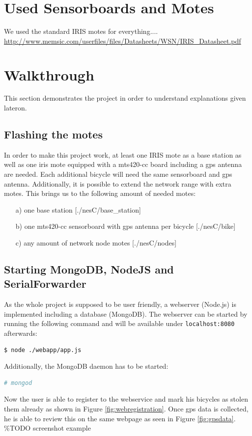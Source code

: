 \documentclass[a4paper]{article}
\begin{document}
\section{Used Sensorboards and Motes}
We used the standard IRIS motes for everything....
\url{http://www.memsic.com/userfiles/files/Datasheets/WSN/IRIS_Datasheet.pdf}

\section{Walkthrough}
This section demonstrates the project in order to understand explanations given lateron. 
\subsection{Flashing the motes}
In order to make this project work, at least one IRIS mote as a base station as well as one iris mote equipped with a mts420-cc board including a gps antenna are needed. Each additional bicycle will need the same sensorboard and gps antenna. Additionally, it is possible to extend the network range with extra motes. This brings us to the following amount of needed motes:
\begin{enumerate}
\item[a)] one base station [./nesC/base\_station]
\item[b)] one mts420-cc sensorboard with gps antenna per bicycle [./nesC/bike]
\item[c)] any amount of network node motes [./nesC/nodes]
\end{enumerate}
\subsection{Starting MongoDB, NodeJS and SerialForwarder}
As the whole project is supposed to be user friendly, a webserver (Node.js) is implemented including a database (MongoDB).
The webserver can be started by running the following command and will be available under \texttt{localhost:8080} afterwards:
\begin{lstlisting}[frame=single,language=bash]
$ node ./webapp/app.js
\end{lstlisting}
Additionally, the MongoDB daemon has to be started:
\begin{lstlisting}[frame=single,language=bash]
# mongod
\end{lstlisting}
Now the user is able to register to the webservice and mark his bicycles as stolen them already as shown in Figure \ref{fig:webregistration}. Once gps data is collected, he is able to review this on the same webpage as seen in Figure \ref{fig:gpsdata}. \%TODO screenshot example\\
\end{document}
